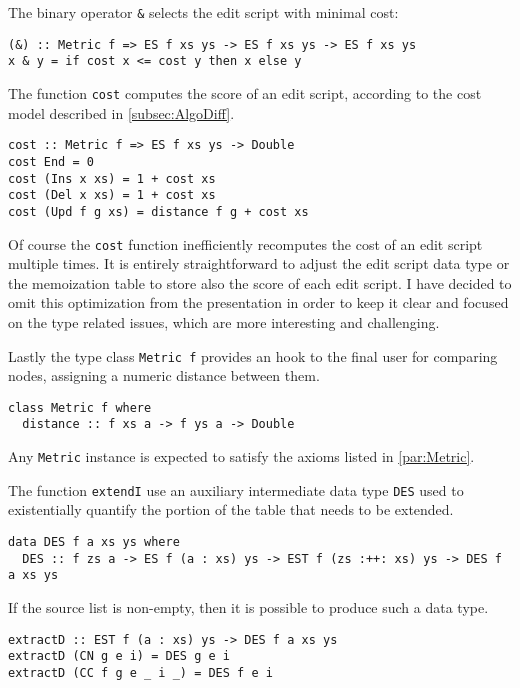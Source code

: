 \documentclass[../Thesis.tex]{subfiles}
\begin{document}
	The binary operator \texttt{\&} selects the edit script with minimal cost:

\begin{verbatim}
(&) :: Metric f => ES f xs ys -> ES f xs ys -> ES f xs ys
x & y = if cost x <= cost y then x else y
\end{verbatim}

	The function \texttt{cost} computes the score of an edit script,
	according to the cost model described in \ref{subsec:AlgoDiff}.

\begin{verbatim}
cost :: Metric f => ES f xs ys -> Double	
cost End = 0
cost (Ins x xs) = 1 + cost xs
cost (Del x xs) = 1 + cost xs
cost (Upd f g xs) = distance f g + cost xs
\end{verbatim}

	Of course the \texttt{cost} function inefficiently recomputes the cost of an 
	edit script multiple times.
	It is entirely straightforward to adjust the edit script data type or the 
	memoization table to store also the score of each edit script.
	I have decided to omit this optimization from the presentation in order
	to keep it clear	and focused on the type related issues, which are 
	more interesting and challenging.
	
	Lastly the type class \texttt{Metric f} provides an hook to the final user
	for comparing nodes, assigning a numeric distance between them.
\begin{verbatim}
class Metric f where
  distance :: f xs a -> f ys a -> Double
\end{verbatim}
	Any \texttt{Metric} instance is expected to satisfy the axioms listed 
	in \ref{par:Metric}.	
	
	The function \texttt{extendI} use an auxiliary intermediate 
	data type \texttt{DES} used to existentially quantify the portion of the table
	that needs to be extended.
	
\begin{verbatim}
data DES f a xs ys where
  DES :: f zs a -> ES f (a : xs) ys -> EST f (zs :++: xs) ys -> DES f a xs ys
\end{verbatim}

	If the source list is non-empty, then it is possible to produce such a
	data type.

\begin{verbatim}
extractD :: EST f (a : xs) ys -> DES f a xs ys
extractD (CN g e i) = DES g e i
extractD (CC f g e _ i _) = DES f e i
\end{verbatim}
\end{document}

